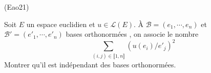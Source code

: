 \begin{tiny}(Eao21)\end{tiny} Soit $E$ un espace euclidien et $u\in \mathcal{L}(E)$.\newline 
\`A $\mathcal{B} = (e_1,\cdots, e_n)$ et $\mathcal{B}' = (e'_1,\cdots, e'_n)$ bases orthonormées , on associe le nombre
\begin{displaymath}
  \sum_{(i,j)\in \llbracket 1,n\rrbracket}(u(e_i)/e'_j)^2
\end{displaymath}
Montrer qu'il est indépendant des bases orthonormées.

